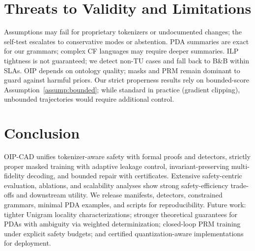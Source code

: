 \documentclass{article}
\begin{document}
\section{Threats to Validity and Limitations}
Assumptions may fail for proprietary tokenizers or undocumented changes; the self-test escalates to conservative modes or abstention. PDA summaries are exact for our grammars; complex CF languages may require deeper summaries. ILP tightness is not guaranteed; we detect non-TU cases and fall back to B\&B within SLAs. OIP depends on ontology quality; masks and PRM remain dominant to guard against harmful priors. Our strict properness results rely on bounded-score Assumption~\ref{assump:bounded}; while standard in practice (gradient clipping), unbounded trajectories would require additional control.

\section{Conclusion}
OIP-CAD unifies tokenizer-aware safety with formal proofs and detectors, strictly proper masked training with adaptive leakage control, invariant-preserving multi-fidelity decoding, and bounded repair with certificates. Extensive safety-centric evaluation, ablations, and scalability analyses show strong safety-efficiency trade-offs and downstream utility. We release manifests, detectors, constrained grammars, minimal PDA examples, and scripts for reproducibility. Future work: tighter Unigram locality characterizations; stronger theoretical guarantees for PDAs with ambiguity via weighted determinization; closed-loop PRM training under explicit safety budgets; and certified quantization-aware implementations for deployment.
\end{document}

